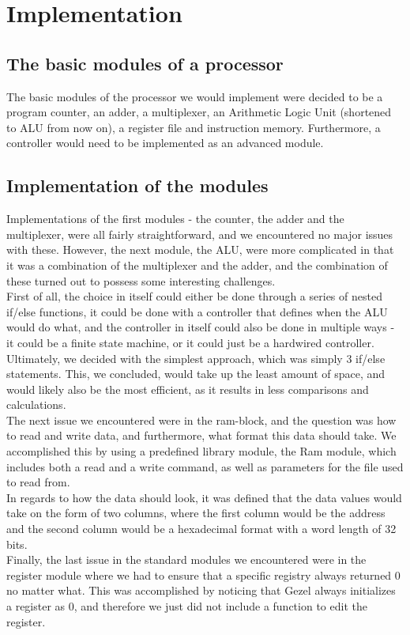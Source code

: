 \documentclass[12pt,a4paper]{article}
\begin{document}
\section{Implementation}
\subsection{The basic modules of a processor}
The basic modules of the processor we would implement were decided to be a program counter, an adder, a multiplexer, an Arithmetic Logic Unit (shortened to ALU from now on), a register file and instruction memory. Furthermore, a controller would need to be implemented as an advanced module.

\subsection{Implementation of the modules}
Implementations of the first modules - the counter, the adder and the multiplexer, were all fairly straightforward, and we encountered no major issues with these. However, the next module, the ALU, were more complicated in that it was a combination of the multiplexer and the adder, and the combination of these turned out to possess some interesting challenges.\\
First of all, the choice in itself could either be done through a series of nested if/else functions, it could be done with a controller that defines when the ALU would do what, and the controller in itself could also be done in multiple ways - it could be a finite state machine, or it could just be a hardwired controller.\\
Ultimately, we decided with the simplest approach, which was simply 3 if/else statements. This, we concluded, would take up the least amount of space, and would likely also be the most efficient, as it results in less comparisons and calculations.\\
The next issue we encountered were in the ram-block, and the question was how to read and write data, and furthermore, what format this data should take. We accomplished this by using a predefined library module, the Ram module, which includes both a read and a write command, as well as parameters for the file used to read from.\\
In regards to how the data should look, it was defined that the data values would take on the form of two columns, where the first column would be the address and the second column would be a hexadecimal format with a word length of 32 bits.\\
Finally, the last issue in the standard modules we encountered were in the register module where we had to ensure that a specific registry always returned 0 no matter what. This was accomplished by noticing that Gezel always initializes a register as 0, and therefore we just did not include a function to edit the register.
\end{document}
